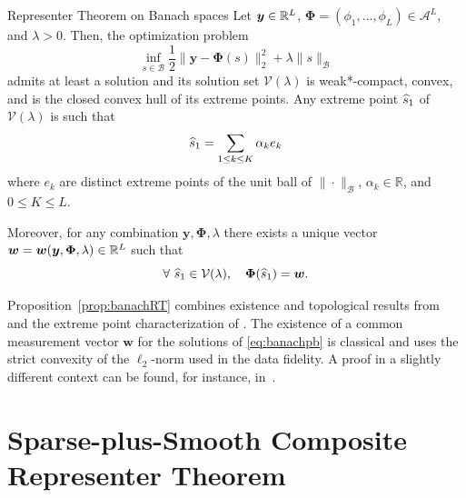 \documentclass[12pt]{article}
\begin{document}
    \begin{proposition}{Representer Theorem on Banach spaces}
    \label{prop:banachRT}
     Let $\bm{y}\in \mathbb{R}^L$, $\bm{\Phi}= (\phi_1 ,\ldots , \phi_L) \in \mathcal{A}^L$, and $\lambda > 0$. Then, the optimization problem 
    \begin{equation} \label{eq:banachpb}
        \inf_{s \in \mathcal{B}} \frac{1}{2} \| \bm{y} - \bm{\Phi}(s) \|_2^2 + \lambda \| s \|_{\mathcal{B}}
    \end{equation}
    admits at least a solution and its solution set $\mathcal{V} (\lambda)$ is weak*-compact, convex, and is the closed convex hull of its extreme points. Any extreme point $\widehat{s}_1$ of $\mathcal{V} (\lambda)$ is such that 
    \begin{equation} \label{eq:widehatbanachextreme}
        \widehat{s}_1  = \sum_{1 \leq k \leq K} \alpha_k e_k
    \end{equation}
    where $e_k$ are distinct extreme points of the unit ball of $\|\cdot \|_{\mathcal{B}}$,  $\alpha_k \in \mathbb{R}$, and $0 \leq K \leq L$.

    Moreover, for any combination $\bm{y}, \bm{\Phi},\lambda$ there exists a unique vector $\bm{w} = \bm{w}(\bm{y}, \bm{\Phi},\lambda) \in \mathbb{R}^L$ such that
    \begin{equation} \label{eq:zlambda}
        \forall\ \widehat{s}_1 \in \mathcal{V} (\lambda), \quad \bm{\Phi}(\widehat{s}_1) = \bm{w}.
    \end{equation}
    \end{proposition}
    
    Proposition~\ref{prop:banachRT} combines existence and topological results from~\cite[Proposition 8]{gupta2018continuous} and the extreme point characterization of \cite[Theorem 3.1]{boyer2019representer}.
    The existence of a common measurement vector $\bm{w}$ for the solutions of \eqref{eq:banachpb} is classical and uses the strict convexity of the $\ell_2$-norm used in the data fidelity. A proof in a slightly different context can be found, for instance, in~\cite[Proposition 7]{debarre2022sparsest}.


\section{Sparse-plus-Smooth Composite Representer Theorem}
\end{document}
